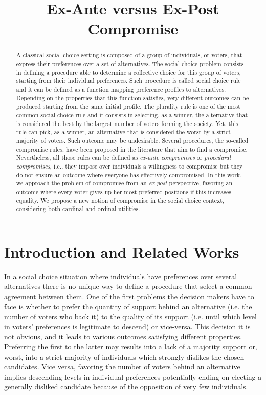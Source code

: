 \documentclass[version=3.21, pagesize, notitlepage, twoside=off, bibliography=totoc, DIV=calc, fontsize=12pt, a4paper]{scrartcl}
\title{Ex-Ante versus Ex-Post \\ Compromise}
\author{}
\date{}
\begin{document}
\maketitle
\thispagestyle{empty}

\begin{abstract}
	A classical social choice setting is composed of a group of individuals, or voters, that express their preferences over a set of alternatives. The social choice problem consists in defining a procedure able to determine a collective choice for this group of voters, starting from their individual preferences. Such procedure is called social choice rule and it can be defined as a function mapping preference profiles to alternatives. Depending on the properties that this function satisfies, very different outcomes can be produced starting from the same initial profile. The plurality rule is one of the most common social choice rule and it consists in selecting, as a winner, the alternative that is considered the best by the largest number of voters forming the society. Yet, this rule can pick, as a winner, an alternative that is considered the worst by a strict majority of voters. Such outcome may be undesirable. Several procedures, the so-called compromise rules, have been proposed in the literature that aim to find a compromise. Nevertheless, all those rules can be defined as \textit{ex-ante compromises} or \textit{procedural compromises}, i.e., they impose over individuals a willingness to compromise but they do not ensure an outcome where everyone has effectively compromised. In this work, we approach the problem of compromise from an \textit{ex-post} perspective, favoring an outcome where every voter gives up her most preferred positions if this increases equality. We propose a new notion of compromise in the social choice context, considering both cardinal and ordinal utilities. 
\end{abstract}

\pagebreak

\section{Introduction and Related Works}

In a social choice situation where individuals have preferences over several alternatives there is no unique way to define a procedure that select a common agreement between them. One of the first problems the decision makers have to face is whether to prefer the quantity of support behind an alternative (i.e. the number of voters who back it) to the quality of its support (i.e. until which level in voters’ preferences is legitimate to descend) or vice-versa. This decision it is not obvious, and it leads to various outcomes satisfying different properties. Preferring the first to the latter may results into a lack of a majority support or, worst, into a strict majority of individuals which strongly dislikes the chosen candidates. Vice versa, favoring the number of voters behind an alternative implies descending levels in individual preferences potentially ending on electing a generally disliked candidate because of the opposition of very few individuals. 
\end{document}

